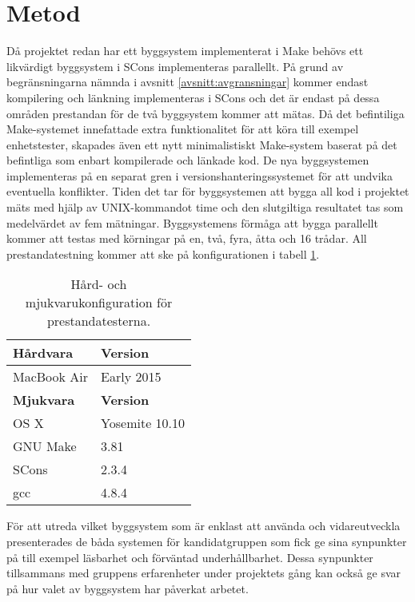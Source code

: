 \section{Metod} \label{avsnitt:metod}
Då projektet redan har ett byggsystem implementerat i Make behövs ett likvärdigt byggsystem i SCons implementeras parallellt. På grund av begränsningarna nämnda i avsnitt \ref{avsnitt:avgransningar} kommer endast kompilering och länkning implementeras i SCons och det är endast på dessa områden prestandan för de två byggsystem kommer att mätas. Då det befintiliga Make-systemet innefattade extra funktionalitet för att köra till exempel enhetstester, skapades även ett nytt minimalistiskt Make-system baserat på det befintliga som enbart kompilerade och länkade kod. De nya byggsystemen implementeras på en separat gren i versionshanteringssystemet för att undvika eventuella konflikter.
\newline
\newline
Tiden det tar för byggsystemen att bygga all kod i projektet mäts med hjälp av UNIX-kommandot time och den slutgiltiga resultatet tas som medelvärdet av fem mätningar. Byggsystemens förmåga att bygga parallellt kommer att testas med körningar på en, två, fyra, åtta och 16 trådar.
\newline
\newline
All prestandatestning kommer att ske på konfigurationen i tabell \ref{tabell:konfig}.

\begin{table}[h!]
  \centering
  \begin{tabular}{|l|l|}
    \hline
    \textbf{Hårdvara} & \textbf{Version} \\ \hline
    MacBook Air & Early 2015 \\ \hline
    \textbf{Mjukvara} & \textbf{Version} \\ \hline
    OS X & Yosemite 10.10 \\ \hline
    GNU Make & 3.81 \\ \hline
    SCons & 2.3.4 \\ \hline
    gcc & 4.8.4 \\ \hline
  \end{tabular}
  \caption{Hård- och mjukvarukonfiguration för prestandatesterna.}
  \label{tabell:konfig}
\end{table}

För att utreda vilket byggsystem som är enklast att använda och vidareutveckla presenterades de båda systemen för kandidatgruppen som fick ge sina synpunkter på till exempel läsbarhet och förväntad underhållbarhet. Dessa synpunkter tillsammans med gruppens erfarenheter under projektets gång kan också ge svar på hur valet av byggsystem har påverkat arbetet.
